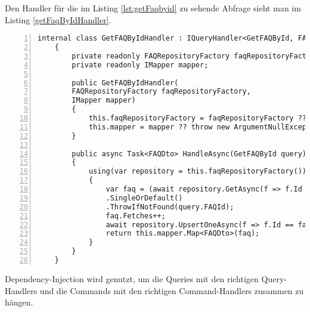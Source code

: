 Den Handler für die im Listing \ref{lst:getFaqbyid} zu sehende Abfrage sieht man im Listing \ref{getFaqByIdHandler}.
\begin{lstlisting}[caption={CQS-Handler Beispiel},captionpos=b, numbers=left, backgroundcolor=\color{black!10},language={[Sharp]C}, label={getFaqByIdHandler}]
	internal class GetFAQByIdHandler : IQueryHandler<GetFAQById, FAQDto>
	{
		private readonly FAQRepositoryFactory faqRepositoryFactory;
		private readonly IMapper mapper;
		
		public GetFAQByIdHandler(
		FAQRepositoryFactory faqRepositoryFactory,
		IMapper mapper)
		{
			this.faqRepositoryFactory = faqRepositoryFactory ?? throw new ArgumentNullException (nameof(faqRepositoryFactory));
			this.mapper = mapper ?? throw new ArgumentNullException(nameof(mapper));
		}
		
		public async Task<FAQDto> HandleAsync(GetFAQById query)
		{
			using(var repository = this.faqRepositoryFactory())
			{
				var faq = (await repository.GetAsync(f => f.Id == query.FAQId))
				.SingleOrDefault()
				.ThrowIfNotFound(query.FAQId);
				faq.Fetches++;
				await repository.UpsertOneAsync(f => f.Id == faq.Id, faq);
				return this.mapper.Map<FAQDto>(faq);
			}
		}
	}
\end{lstlisting}
Dependency-Injection wird genutzt, um die Queries mit den richtigen Query-Handlers und die Commands mit den richtigen Command-Handlers zusammen zu hängen. \autocite{cqsSOLIDeArchitektur}